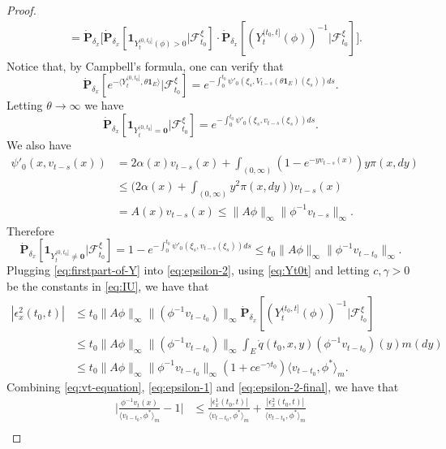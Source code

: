 \documentclass[UTF8]{pkuthss}
\theoremstyle{plain}
\theoremstyle{definition}
\numberwithin{equation}{section}
\begin{document}
\begin{proof}
\begin{align}
	&= \dot{\mathbf P}_{\delta_x} \big[\dot{\mathbf P}_{\delta_x}[\mathbf 1_{Y_t^{(0,t_0]}(\phi)>0}|\mathscr F^\xi_{t_0}] \cdot \dot{\mathbf P}_{\delta_x}[ (Y^{(t_0,t]}_t(\phi))^{-1}|\mathscr F^\xi_{t_0}] \big].
\end{align}
	Notice that, by Campbell's formula, one can verify that
\[
	\dot{\mathbf P}_{\delta_x}[e^{-\langle Y_t^{(0,t_0]},\theta \mathbf 1_E\rangle}|\mathscr F^\xi_{t_0}]
	= e^{-\int_0^{t_0}\psi'_0(\xi_s,V_{t-s}(\theta\mathbf 1_E)(\xi_s))ds}.
\]
	Letting $\theta \to \infty$ we have
\[
	\dot {\mathbf P}_{\delta_x} [ \mathbf 1_{Y_t^{(0,t_0]}=\mathbf 0} | \mathscr F^\xi_{t_0}]
	= e^{-\int_0^{t_0}\psi'_0(\xi_s,v_{t-s}(\xi_s))ds}.
\]
	We also have
\begin{align}
	\psi'_0(x,v_{t-s}(x))
	&= 2\alpha(x)v_{t-s}(x) +\int_{(0,\infty)} (1-e^{-yv_{t-s}(x)})y\pi(x,dy)\\
	&\leq \big( 2\alpha (x)+\int_{(0,\infty)}y^2\pi(x,dy) \big) v_{t-s}(x)\\
	&= A(x) v_{t-s}(x) \leq \| A\phi\|_\infty \|\phi^{-1}v_{t-s}\|_\infty.
\end{align}
	Therefore
\begin{equation}\label{eq:firstpart-of-Y}
	\dot{\mathbf P}_{\delta_x}[\mathbf 1_{Y_t^{(0,t_0]}\neq \mathbf 0}|\mathscr F^\xi_{t_0}]
	= 1-e^{-\int_0^{t_0}\psi'_0(\xi_s,v_{t-s}(\xi_s))ds}
	\leq t_0\| A\phi\|_\infty \|\phi^{-1}v_{t-t_0}\|_\infty.
\end{equation}
	Plugging \eqref{eq:firstpart-of-Y} into \eqref{eq:epsilon-2}, using \eqref{eq:Yt0t} and letting $c,\gamma > 0$ be the constants in \eqref{eq:IU}, we have that
\begin{align}\label{eq:epsilon-2-final}
	|\epsilon_x^2(t_0,t)|
	& \leq t_0\| A\phi\|_\infty \|(\phi^{-1}v_{t-t_0})\|_\infty \dot{\mathbf P}_{\delta_x}[ (Y^{(t_0,t]}_t(\phi))^{-1}|\mathscr F^\xi_{t_0}] \\
	& \leq t_0\|  A \phi\|_\infty\|(\phi^{-1}v_{t-t_0}) \|_\infty \int_{E} \dot{q} (t_0,x,y)(\phi^{-1}v_{t-t_0})(y) m(dy)\\
	& \leq t_0\| A\phi\|_\infty \| \phi^{-1}v_{t-t_0}\|_\infty (1+ce^{-\gamma t_0}) \langle v_{t-t_0},\phi^* \rangle_m.
\end{align}
	Combining \eqref{eq:vt-equation}, \eqref{eq:epsilon-1} and \eqref{eq:epsilon-2-final}, we have that
\begin{align}\label{vts-inequality}
	\Big|\frac{\phi^{-1}v_t(x)}{\langle v_{t-t_0},\phi^* \rangle_m}-1 \Big|
	&\leq \frac{|\epsilon_x^1(t_0,t)|}{\langle v_{t-t_0},\phi^* \rangle_m} + \frac{|\epsilon_x^2(t_0,t)|}{\langle v_{t-t_0},\phi^* \rangle_m}\\

\end{align}
\end{proof}
\end{document}
